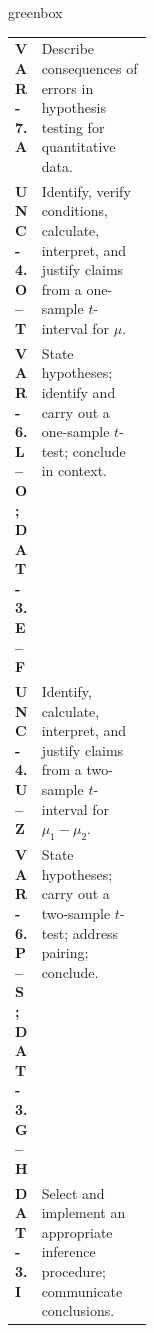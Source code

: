 \documentclass[10pt]{article}
\begin{document}
\begin{skillbox}{greenbox}
\small
\begin{tabularx}{\linewidth}{@{} >{\bfseries}p{0.16\linewidth} X @{}}
  VAR-7.A        & Describe consequences of errors in hypothesis testing for quantitative data. \\
  UNC-4.O--T     & Identify, verify conditions, calculate, interpret, and justify claims from a one-sample $t$-interval for $\mu$. \\
  VAR-6.L--O; DAT-3.E--F & State hypotheses; identify and carry out a one-sample $t$-test; conclude in context. \\
  UNC-4.U--Z     & Identify, calculate, interpret, and justify claims from a two-sample $t$-interval for $\mu_1 - \mu_2$. \\
  VAR-6.P--S; DAT-3.G--H & State hypotheses; carry out a two-sample $t$-test; address pairing; conclude. \\
  DAT-3.I        & Select and implement an appropriate inference procedure; communicate conclusions. \\
\end{tabularx}
\end{skillbox}
\end{document}
